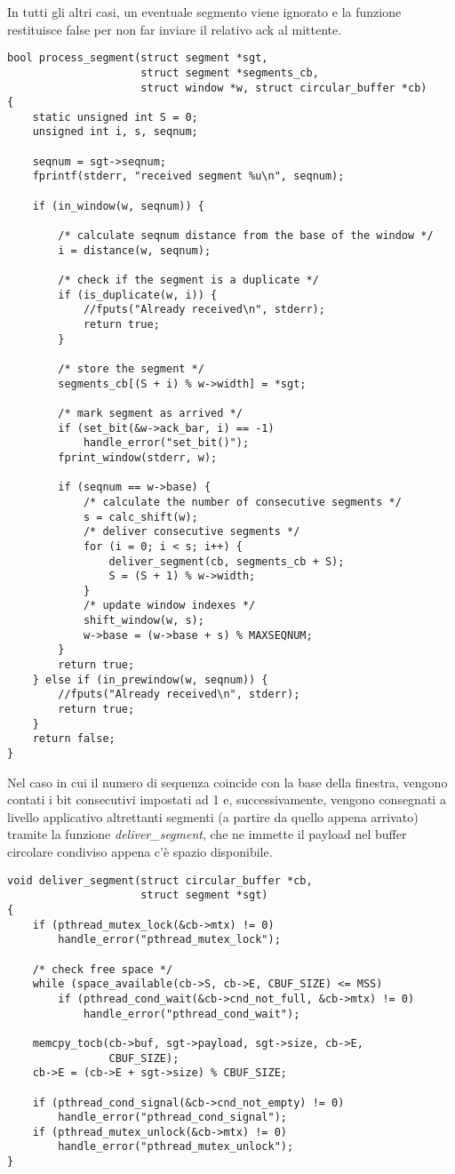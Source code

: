 In tutti gli altri casi, un eventuale segmento viene ignorato e la funzione 
restituisce false per non far inviare il relativo ack al mittente.
\begin{lstlisting}[title=transport.c]
bool process_segment(struct segment *sgt, 
                     struct segment *segments_cb,
                     struct window *w, struct circular_buffer *cb)
{
    static unsigned int S = 0;
    unsigned int i, s, seqnum;

    seqnum = sgt->seqnum;
    fprintf(stderr, "received segment %u\n", seqnum);

    if (in_window(w, seqnum)) {

        /* calculate seqnum distance from the base of the window */
        i = distance(w, seqnum);

        /* check if the segment is a duplicate */
        if (is_duplicate(w, i)) {
            //fputs("Already received\n", stderr);
            return true;
        }

        /* store the segment */
        segments_cb[(S + i) % w->width] = *sgt;

        /* mark segment as arrived */
        if (set_bit(&w->ack_bar, i) == -1)
            handle_error("set_bit()");
        fprint_window(stderr, w);

        if (seqnum == w->base) {
            /* calculate the number of consecutive segments */
            s = calc_shift(w);
            /* deliver consecutive segments */
            for (i = 0; i < s; i++) {
                deliver_segment(cb, segments_cb + S);
                S = (S + 1) % w->width;
            }
            /* update window indexes */
            shift_window(w, s);
            w->base = (w->base + s) % MAXSEQNUM;
        }
        return true;
    } else if (in_prewindow(w, seqnum)) {
        //fputs("Already received\n", stderr);
        return true;
    }
    return false;
}
\end{lstlisting}
Nel caso in cui il numero di sequenza coincide con la base della finestra,
vengono contati i bit consecutivi impostati ad 1 e, successivamente, 
vengono consegnati a livello applicativo altrettanti segmenti (a partire 
da quello appena arrivato) tramite la funzione \emph{deliver\_segment}, 
che ne immette il payload nel buffer circolare condiviso appena c'è spazio
disponibile.
\begin{lstlisting}[title=transport.c]
void deliver_segment(struct circular_buffer *cb, 
                     struct segment *sgt)
{
    if (pthread_mutex_lock(&cb->mtx) != 0)
        handle_error("pthread_mutex_lock");

    /* check free space */
    while (space_available(cb->S, cb->E, CBUF_SIZE) <= MSS) 
        if (pthread_cond_wait(&cb->cnd_not_full, &cb->mtx) != 0)
            handle_error("pthread_cond_wait");

    memcpy_tocb(cb->buf, sgt->payload, sgt->size, cb->E, 
                CBUF_SIZE);
    cb->E = (cb->E + sgt->size) % CBUF_SIZE;

    if (pthread_cond_signal(&cb->cnd_not_empty) != 0)
        handle_error("pthread_cond_signal");
    if (pthread_mutex_unlock(&cb->mtx) != 0)
        handle_error("pthread_mutex_unlock");
}
\end{lstlisting}
